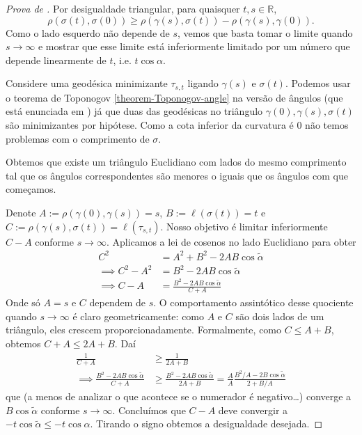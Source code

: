 \documentclass{book}
\begin{document}
\begin{proof}[Prova de \cite{Cheeger-Ebin}]
Por desigualdade triangular, para quaisquer
$t,s \in \mathbb{R}$,
$$
\rho(\sigma(t),\sigma(0)) \geq
\rho(\gamma(s),\sigma(t))-\rho(\gamma(s),
\gamma(0)).
$$
Como o lado esquerdo não depende de $s$,
vemos que basta tomar o limite quando
$s\to \infty$ e mostrar que esse limite está
inferiormente limitado por um
número que depende linearmente de $t$, i.e.
$t \cos\alpha$.

Considere uma geodésica minimizante
$\tau_{s,t}$ ligando $\gamma(s)$ e
$\sigma(t)$. Podemos usar o teorema de
Toponogov \ref{theorem-Toponogov-angle}
na versão de ângulos (que está enunciada em
\cite{Cheeger-Ebin}) já que duas das
geodésicas no triângulo
$\gamma(0),\gamma(s),\sigma(t)$ são
minimizantes por
hipótese. Como a cota inferior da curvatura é
0 não temos problemas com o
comprimento de $\sigma$.

Obtemos que existe um triângulo Euclidiano
com lados do mesmo comprimento tal
que os ângulos correspondentes são menores o
iguais que os ângulos com que
começamos.

Denote $A:=\rho(\gamma(0),\gamma(s))=s$,
$B:=\ell(\sigma(t))=t$ e
 $C:=\rho(\gamma(s),\sigma(t))=\ell(\tau_{s,
 t})$.
Nosso objetivo é limitar inferiormente $C-A$
conforme  $s \to \infty$.
 Aplicamos a lei de cosenos no lado
 Euclidiano para obter
$$
\begin{aligned}
C^2&=A^2+B^2-2AB\cos\tilde{\alpha}\\
\implies C^2-A^2&=B^2-2AB\cos\tilde{\alpha}\\
\implies
C-A&=\frac{B^2-2AB\cos\tilde{\alpha}}{C+A}
\end{aligned}
$$
Onde só $A=s$ e $C$ dependem de $s$. O
comportamento assintótico desse quociente
quando $s \to \infty$ é claro
geometricamente: como $A$ e $C$ são dois
lados de
um triângulo, eles crescem
proporcionadamente. Formalmente, como $C \leq
A+B$,
obtemos $C+A \leq 2A+B$. Daí
$$
\begin{aligned}
\frac{1}{C+A}&\geq \frac{1}{2A+B}\\
\implies \frac{B^2-2AB\cos
\tilde{\alpha}}{C+A}&\geq
 \frac{B^2-2AB \cos \tilde{\alpha}}{2A+B}
=\frac{A}{A}\frac{B^2/A-2B\cos
\tilde{\alpha}}{2+B/A}
\end{aligned}
$$
que (a menos de analizar o que acontece se o
numerador é negativo…)
 converge a $B\cos \tilde{\alpha}$ conforme
 $s \to \infty$.
 Concluímos que $C-A$ deve
convergir a
$-t\cos\tilde{\alpha}\leq-t\cos\alpha$.
Tirando o signo obtemos a
desigualdade desejada.
\end{proof}
\end{document}
